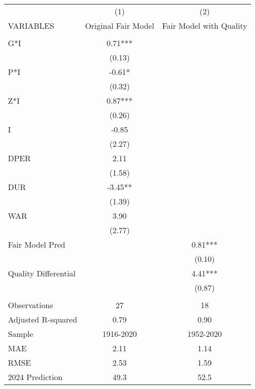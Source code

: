 \begin{tabular}{lcc} \hline
 & (1) & (2) \\
VARIABLES & Original Fair Model & Fair Model with Quality \\ \hline
 &  &  \\
G*I & 0.71*** &  \\
 & (0.13) &  \\
P*I & -0.61* &  \\
 & (0.32) &  \\
Z*I & 0.87*** &  \\
 & (0.26) &  \\
I & -0.85 &  \\
 & (2.27) &  \\
DPER & 2.11 &  \\
 & (1.58) &  \\
DUR & -3.45** &  \\
 & (1.39) &  \\
WAR & 3.90 &  \\
 & (2.77) &  \\
Fair Model Pred &  & 0.81*** \\
 &  & (0.10) \\
Quality Differential &  & 4.41*** \\
 &  & (0.87) \\
 &  &  \\
Observations & 27 & 18 \\
Adjusted R-squared & 0.79 & 0.90 \\
Sample & 1916-2020 & 1952-2020 \\
MAE & 2.11 & 1.14 \\
RMSE & 2.53 & 1.59 \\
 2024 Prediction & 49.3 & 52.5 \\ \hline
\end{tabular}
